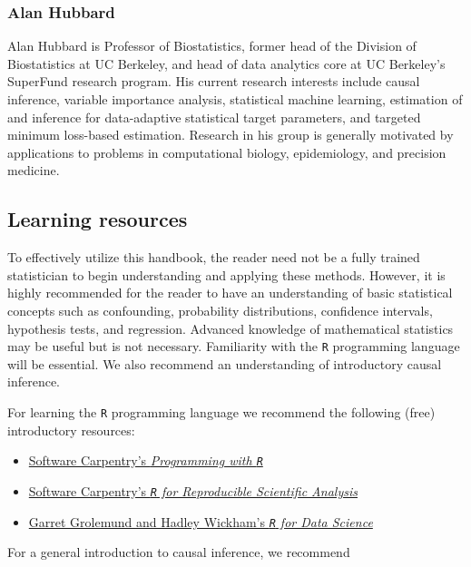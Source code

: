\documentclass[12pt, krantz2,]{krantz}
\providecommand{\tightlist}{%
  \setlength{\itemsep}{0pt}\setlength{\parskip}{0pt}}
\theoremstyle{definition}
\theoremstyle{definition}
\theoremstyle{definition}
\newcommand{\1}{\mathbbm{1}}
\begin{document}
\hypertarget{alan-hubbard}{%
\subsubsection*{Alan Hubbard}\label{alan-hubbard}}


Alan Hubbard is Professor of Biostatistics, former head of the Division of
Biostatistics at UC Berkeley, and head of data analytics core at UC Berkeley's
SuperFund research program. His current research interests include causal
inference, variable importance analysis, statistical machine learning,
estimation of and inference for data-adaptive statistical target parameters, and
targeted minimum loss-based estimation. Research in his group is generally
motivated by applications to problems in computational biology, epidemiology,
and precision medicine.

\hypertarget{learn}{%
\subsection{Learning resources}\label{learn}}

To effectively utilize this handbook, the reader need not be a fully trained
statistician to begin understanding and applying these methods. However, it is
highly recommended for the reader to have an understanding of basic statistical
concepts such as confounding, probability distributions, confidence intervals,
hypothesis tests, and regression. Advanced knowledge of mathematical statistics
may be useful but is not necessary. Familiarity with the \texttt{R} programming
language will be essential. We also recommend an understanding of introductory
causal inference.

For learning the \texttt{R} programming language we recommend the following (free)
introductory resources:

\begin{itemize}
\tightlist
\item
  \href{http://swcarpentry.github.io/r-novice-inflammation/}{Software Carpentry's \emph{Programming with
  \texttt{R}}}
\item
  \href{http://swcarpentry.github.io/r-novice-gapminder/}{Software Carpentry's \emph{\texttt{R} for Reproducible Scientific
  Analysis}}
\item
  \href{https://r4ds.had.co.nz}{Garret Grolemund and Hadley Wickham's \emph{\texttt{R} for Data
  Science}}
\end{itemize}

For a general introduction to causal inference, we recommend
\end{document}

